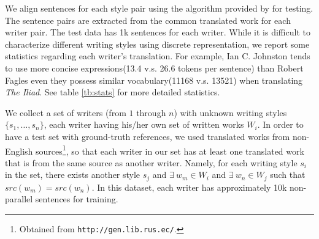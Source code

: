 We align sentences for each style pair using the algorithm provided by \citet{chen2019align} for testing. The sentence pairs are extracted from the common translated work for each writer pair. The test data has 1k sentences for each writer. While it is difficult to characterize different writing styles using discrete representation, we report some statistics regarding each writer's translation. For example, Ian C. Johnston tends to use more concise expressions(13.4 v.s. 26.6 tokens per sentence) than Robert Fagles even they possess similar vocabulary(11168 v.s. 13521) when translating \textit{The Iliad}. See table \ref{tb:stats} for more detailed statistics.

We collect a set of writers (from $1$ through $n$) with unknown writing styles 
$\{s_1, \ldots, s_n\}$, each writer having his/her own set of written works $W_i$. In order to have a test set with ground-truth references, we used translated works from non-English sources\footnote{Obtained from \texttt{http://gen.lib.rus.ec/}.}, so that each writer in our set has at least one translated work that is from the same source as another writer. Namely, for each writing style $s_i$ in the set, there exists another style $s_j$ and $\exists\ w_m \in W_i$ 
and $\exists\ w_n \in W_j$ such that $src(w_m) = src(w_n)$. In this dataset, each writer has approximately 10k non-parallel sentences for training.




